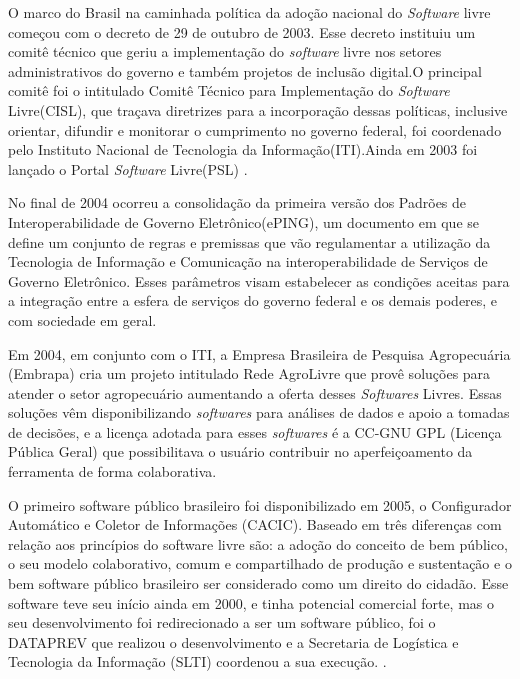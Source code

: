 \documentclass[12pt]{article}
\begin{document}
O marco do Brasil na caminhada política da adoção nacional do \textit{Software} livre começou com o decreto de 29 de outubro de 2003. Esse decreto instituiu um comitê técnico que geriu a implementação do \textit{software} livre nos setores administrativos do governo e também projetos de inclusão digital\cite{torres2018software}.O principal comitê foi o intitulado Comitê Técnico para Implementação do \textit{Software} Livre(CISL), que traçava diretrizes para a incorporação dessas políticas, inclusive orientar, difundir e monitorar o cumprimento no governo federal, foi coordenado pelo Instituto Nacional de Tecnologia da Informação(ITI).Ainda em 2003 foi lançado o Portal \textit{Software} Livre(PSL) \cite{tiboni2014software}.

No final de 2004 ocorreu a consolidação da primeira versão dos  Padrões de Interoperabilidade de Governo Eletrônico(ePING), um documento em que se define um conjunto de regras e premissas que vão regulamentar a utilização da Tecnologia de Informação e Comunicação na interoperabilidade de Serviços de Governo Eletrônico. Esses parâmetros visam estabelecer as condições aceitas para a integração entre a esfera de serviços do governo federal e os demais poderes, e com sociedade em geral.

Em 2004, em conjunto com o ITI, a Empresa Brasileira de Pesquisa Agropecuária (Embrapa) cria um projeto intitulado Rede AgroLivre que provê soluções para atender o setor agropecuário aumentando a oferta desses \textit{Softwares} Livres. Essas soluções vêm disponibilizando \textit{softwares} para análises de dados e apoio a tomadas de decisões, e a licença adotada para esses \textit{softwares} é a CC-GNU GPL (Licença Pública Geral) que possibilitava o usuário contribuir no aperfeiçoamento da ferramenta de forma colaborativa.  \cite{mendes2007licenciamento}

O primeiro software público brasileiro foi disponibilizado em 2005, o Configurador Automático e Coletor de Informações (CACIC). Baseado em três diferenças com relação aos princípios do software livre são: a adoção do conceito de bem público, o seu modelo colaborativo, comum e compartilhado de produção e sustentação e o bem software público brasileiro ser considerado como um direito do cidadão. Esse software teve seu início ainda em 2000, e tinha potencial comercial forte, mas o seu desenvolvimento foi redirecionado a ser um software público, foi o DATAPREV que realizou o desenvolvimento e a Secretaria de Logística e Tecnologia da Informação (SLTI) coordenou a sua execução. \cite{peterle2005materializaccao}.
\end{document}
